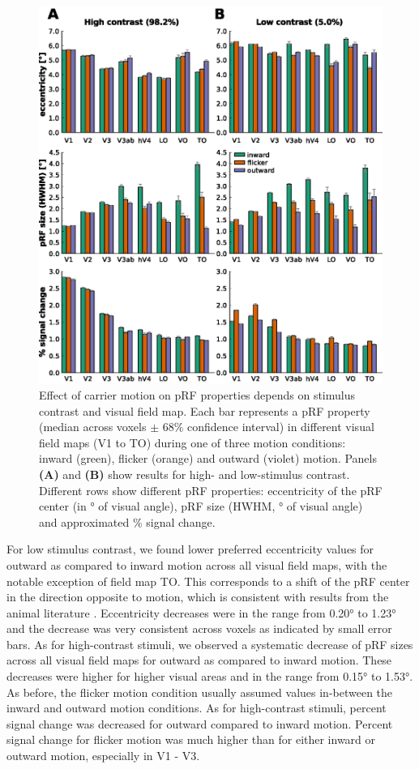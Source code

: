 \begin{figure}[htbp!]
\centering
\includegraphics[width=\textwidth]{figures/chapter_04/fig2a.eps}
\caption{Effect of carrier motion on pRF properties depends on stimulus contrast and visual field map. Each bar represents a pRF property (median across voxels $\pm$ 68\% confidence interval) in different visual field maps (V1 to TO) during one of three motion conditions: inward (green), flicker (orange) and outward (violet) motion. Panels \textbf{(A)} and \textbf{(B)} show results for high- and low-stimulus contrast. Different rows show different pRF properties: eccentricity of the pRF center (in ° of visual angle), pRF size (HWHM, ° of visual angle) and approximated \% signal change.}
\label{fig:effectPrf} 
\end{figure}

For low stimulus contrast, we found lower preferred eccentricity values for outward as compared to inward motion across all visual field maps, with the notable exception of field map TO. This corresponds to a shift of the pRF center in the direction opposite to motion, which is consistent with results from the animal literature \parencite{Fu2004, Sundberg2006}. Eccentricity decreases were in the range from 0.20° to 1.23° and the decrease was very consistent across voxels as indicated by small error bars. As for high-contrast stimuli, we observed a systematic decrease of pRF sizes across all visual field maps for outward as compared to inward motion. These decreases were higher for higher visual areas and in the range from 0.15° to 1.53°. As before, the flicker motion condition usually assumed values in-between the inward and outward motion conditions. As for high-contrast stimuli, percent signal change was decreased for outward compared to inward motion. Percent signal change for flicker motion was much higher than for either inward or outward motion, especially in V1 - V3.


